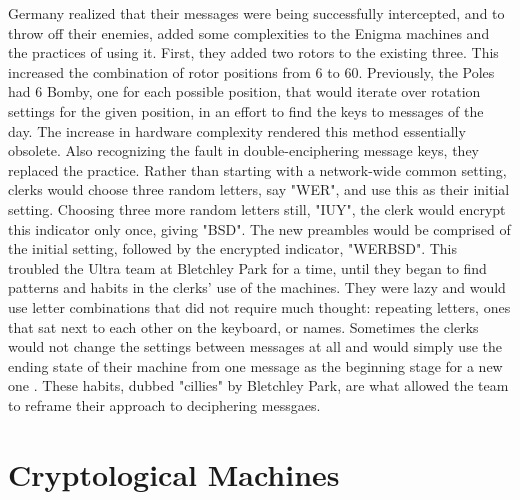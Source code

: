 Germany realized that their messages were being successfully intercepted, and to throw off their enemies, added some complexities to the Enigma machines and the practices of using it. First, they added two rotors to the existing three. This increased the combination of rotor positions from 6 to 60. Previously, the Poles had 6 Bomby, one for each possible position, that would iterate over rotation settings for the given position, in an effort to find the keys to messages of the day. The increase in hardware complexity rendered this method essentially obsolete. Also recognizing the fault in double-enciphering message keys, they replaced the practice. Rather than starting with a network-wide common setting, clerks would choose three random letters, say "WER", and use this as their initial setting. Choosing three more random letters still, "IUY", the clerk would encrypt this indicator only once, giving "BSD". The new preambles would be comprised of the initial setting, followed by the encrypted indicator, "WERBSD". This troubled the Ultra team at Bletchley Park for a time, until they began to find patterns and habits in the clerks' use of the machines. They were lazy and would use letter combinations that did not require much thought: repeating letters, ones that sat next to each other on the keyboard, or names. Sometimes the clerks would not change the settings between messages at all and would simply use the ending state of their machine from one message as the beginning stage for a new one \cite{mf01}. These habits, dubbed "cillies" by Bletchley Park, are what allowed the team to reframe their approach to deciphering messgaes. 

\section{Cryptological Machines}

